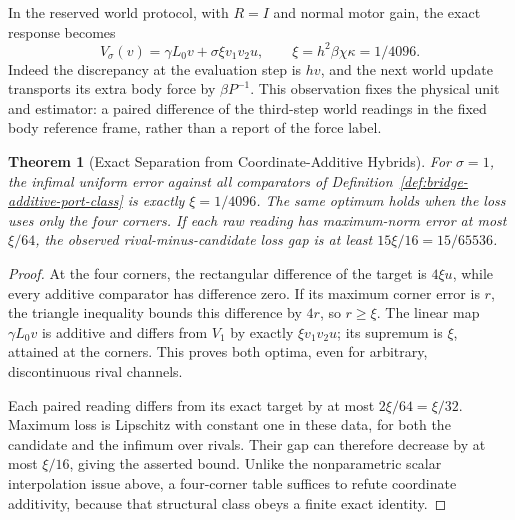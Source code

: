 \documentclass[11pt,a4paper]{article}
\newtheorem{theorem}{Theorem}[section]
\theoremstyle{definition}
\begin{document}
In the reserved world protocol, with $R=I$ and normal motor gain, the exact response becomes
\[
 V_\sigma(v)=\gamma L_0v+\sigma\xi v_1v_2u,
 \qquad \xi=h^2\beta\chi\kappa=1/4096.
\]
Indeed the discrepancy at the evaluation step is $hv$, and the next world update transports its extra body force by $\beta P^{-1}$. This observation fixes the physical unit and estimator: a paired difference of the third-step world readings in the fixed body reference frame, rather than a report of the force label.

\begin{theorem}[Exact Separation from Coordinate-Additive Hybrids]\label{thm:bridge-nonadditive-gap}
For $\sigma=1$, the infimal uniform error against all comparators of Definition~\ref{def:bridge-additive-port-class} is exactly $\xi=1/4096$. The same optimum holds when the loss uses only the four corners. If each raw reading has maximum-norm error at most $\xi/64$, the observed rival-minus-candidate loss gap is at least $15\xi/16=15/65536$.
\end{theorem}
\begin{proof}
At the four corners, the rectangular difference of the target is $4\xi u$, while every additive comparator has difference zero. If its maximum corner error is $r$, the triangle inequality bounds this difference by $4r$, so $r\ge\xi$. The linear map $\gamma L_0v$ is additive and differs from $V_1$ by exactly $\xi v_1v_2u$; its supremum is $\xi$, attained at the corners. This proves both optima, even for arbitrary, discontinuous rival channels.

Each paired reading differs from its exact target by at most $2\xi/64=\xi/32$. Maximum loss is Lipschitz with constant one in these data, for both the candidate and the infimum over rivals. Their gap can therefore decrease by at most $\xi/16$, giving the asserted bound. Unlike the nonparametric scalar interpolation issue above, a four-corner table suffices to refute coordinate additivity, because that structural class obeys a finite exact identity.
\end{proof}
\end{document}

